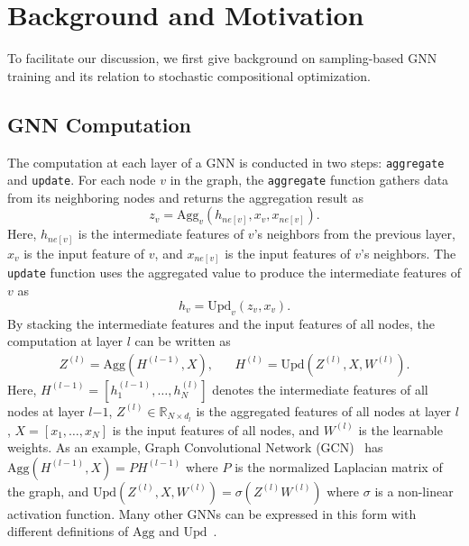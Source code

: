 \section{Background and Motivation}
To facilitate our discussion, we first give background on sampling-based GNN training and its relation to stochastic compositional optimization. 

\subsection{GNN Computation}
The computation at each layer of a GNN is conducted in two steps: {\tt aggregate} and {\tt update}. 
For each node $v$ in the graph, the  {\tt aggregate} function gathers data from its neighboring nodes and returns the aggregation result as 
\begin{equation}
    z_v = \mathrm{Agg}_v(h_{ne[v]}, x_v, x_{ne[v]}). 
\end{equation}
Here, $h_{ne[v]}$ is the intermediate features of $v$'s neighbors from the previous layer, $x_v$ is the input feature of $v$, and $x_{ne[v]}$ is the input features of $v$'s neighbors. 
The {\tt update} function uses the aggregated value to produce the intermediate features of $v$ as 
\begin{equation}
    h_v = \mathrm{Upd}_v(z_v, x_v). 
\end{equation}
By stacking the intermediate features and the input features of all nodes, the computation at layer $l$ can be written as 
\begin{equation}
\label{eq:agg_upd}
\begin{split}
Z^{(l)}=\mathrm{Agg}(H^{(l-1)}, X), \;\;\;\;\;\;
H^{(l)} = \mathrm{Upd}(Z^{(l)}, X, W^{(l)}).
\end{split}
\end{equation}
Here, $H^{(l-1)}=[h^{(l-1)}_1,\ldots, h^{(l)}_N]$ denotes the intermediate features of all nodes at layer $l$$-$$1$, $Z^{(l)}\in \mathbb{R}_{N\times d_l}$ is the aggregated features of all nodes at layer $l$, $X = [x_1,\ldots,x_N]$ is the input features of all nodes, and $ W^{(l)}$ is the learnable weights. 
As an example, Graph Convolutional Network (GCN)~\cite{kipf2017semi} has $\mathrm{Agg}(H^{(l-1)}, X)=PH^{(l-1)}$ where $P$ is the normalized Laplacian matrix of the graph, and $\mathrm{Upd}(Z^{(l)},X,  W^{(l)})=\sigma(Z^{(l)} W^{(l)})$ where $\sigma$ is a non-linear activation function.   
Many other GNNs can be expressed in this form with different definitions of $\mathrm{Agg}$ and $\mathrm{Upd}$~\cite{zhou2018graph}. 





